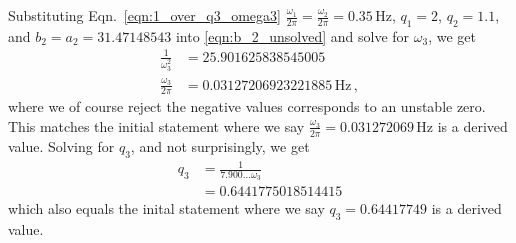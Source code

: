 Substituting Eqn.~\eqref{eqn:1_over_q3_omega3} $\frac{\omega_1}{2\pi}=\frac{\omega_2}{2\pi} = 0.35\,\mathrm{Hz}$, $q_1 = 2$, $q_2 = 1.1$, and $b_2=a_2=31.47148543$ into \eqref{eqn:b_2_unsolved} and solve for $\omega_3$,
we get
\begin{equation}
	\begin{split}
		\frac{1}{\omega_3^2} &= 25.901625838545005\\
		\frac{\omega_3}{2\pi} &= 0.03127206923221885\,\mathrm{Hz}\,,
	\end{split} 
\end{equation}
where we of course reject the negative values corresponds to an unstable zero.
This matches the initial statement where we say $\frac{\omega_3}{2\pi} = 0.031272069\,\mathrm{Hz}$ is a derived value.
Solving for $q_3$, and not surprisingly, we get
\begin{equation}
	\begin{split}
		q_3 &= \frac{1}{7.900\dots\omega_3}\\
		&= 0.6441775018514415
	\end{split}
\end{equation}
which also equals the inital statement where we say $q_3 = 0.64417749$ is a derived value.

